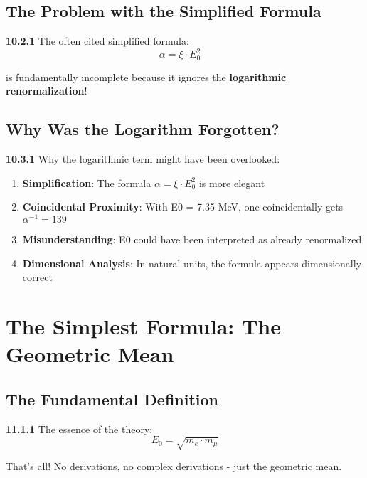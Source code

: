 \documentclass[12pt,a4paper]{article}
\begin{document}
\subsection{The Problem with the Simplified Formula}

\noindent \textbf{10.2.1} The often cited simplified formula:
\begin{equation}
	\boxed{\alpha = \xi \cdot E_0^2} \quad 
\end{equation}

is fundamentally incomplete because it ignores the \textbf{logarithmic renormalization}!

\subsection{Why Was the Logarithm Forgotten?}

\begin{tcolorbox}[colback=yellow!5!white,colframe=orange!75!black,title=Possible Reasons]
	\noindent \textbf{10.3.1} Why the logarithmic term might have been overlooked:
	\begin{enumerate}
		\item \textbf{Simplification}: The formula $\alpha = \xi \cdot E_0^2$ is more elegant
		\item \textbf{Coincidental Proximity}: With E0 = 7.35 MeV, one coincidentally gets $\alpha^{-1} = 139$
		\item \textbf{Misunderstanding}: E0 could have been interpreted as already renormalized
		\item \textbf{Dimensional Analysis}: In natural units, the formula appears dimensionally correct
	\end{enumerate}
\end{tcolorbox}

\section{The Simplest Formula: The Geometric Mean}

\subsection{The Fundamental Definition}

\begin{tcolorbox}[colback=yellow!10!white,colframe=red!75!black,title=\textbf{THE SIMPLEST FORMULA}]
	\noindent \textbf{11.1.1} The essence of the theory:
	\begin{equation}
		\boxed{E_0 = \sqrt{m_e \cdot m_\mu}}
	\end{equation}
	
	That's all! No derivations, no complex derivations - just the geometric mean.
\end{tcolorbox}
\end{document}
